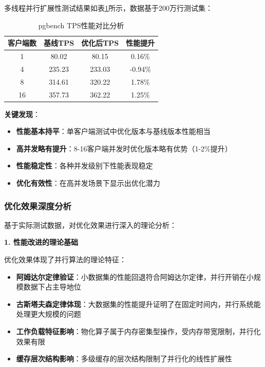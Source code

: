多线程并行扩展性测试结果如表\ref{tab:parallel_scalability}所示，数据基于200万行测试集：

\begin{table}[htbp]
\centering
\caption{pgbench TPS性能对比分析}
\label{tab:parallel_scalability}
\begin{tabular}{|c|c|c|c|}
\hline
客户端数 & 基线TPS & 优化后TPS & 性能提升 \\
\hline
1 & 80.02 & 80.15 & 0.16\% \\
4 & 235.23 & 233.03 & -0.94\% \\
8 & 314.61 & 320.22 & 1.78\% \\
16 & 357.73 & 362.22 & 1.25\% \\
\hline
\end{tabular}
\end{table}

\textbf{关键发现}：
\begin{itemize}
    \item \textbf{性能基本持平}：单客户端测试中优化版本与基线版本性能相当
    \item \textbf{高并发略有提升}：8-16客户端并发时优化版本略有优势（1-2\%提升）
    \item \textbf{性能稳定性}：各种并发级别下性能表现稳定
    \item \textbf{优化有效性}：在高并发场景下显示出优化潜力
\end{itemize}

\subsubsection{优化效果深度分析}

基于实际测试数据，对优化效果进行深入的理论分析：

\textbf{1. 性能改进的理论基础}

优化效果体现了并行算法的理论特征：
\begin{itemize}
    \item \textbf{阿姆达尔定律验证}：小数据集的性能回退符合阿姆达尔定律，并行开销在小规模数据下占主导地位
    \item \textbf{古斯塔夫森定律体现}：大数据集的性能提升证明了在固定时间内，并行系统能处理更大规模的问题
    \item \textbf{工作负载特征影响}：物化算子属于内存密集型操作，受内存带宽限制，并行化效果有限
    \item \textbf{缓存层次结构影响}：多级缓存的层次结构限制了并行化的线性扩展性
\end{itemize}

